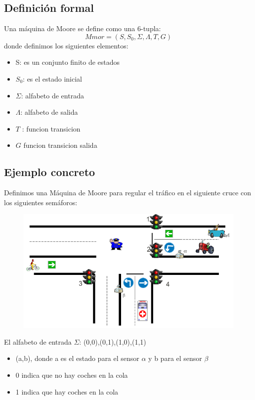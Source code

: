 \documentclass[12pt,a4paper]{article}
\begin{document}
	\subsection{Definición formal}
	Una máquina de Moore se define como una 6-tupla:
	\[ Mmor = (S,S_{0},\Sigma,\Lambda,T,G)  \]
	donde definimos los siguientes elementos:
	\begin{itemize}
		\item S: es un conjunto finito de estados
		\item $S_{0}$: es el estado inicial
		\item $\Sigma$: alfabeto de entrada
		\item $\Lambda$: alfabeto de salida
		\item $T$ : funcion transicion
		\item $G$ funcion transicion salida
	\end{itemize}
	\clearpage

	\subsection{Ejemplo concreto}
	Definimos una Máquina de Moore para regular el tráfico en el siguiente cruce con los siguientes semáforos:
		
	\begin{figure}[h]
		\centering
		\includegraphics[width=0.4\linewidth]{4}
		\caption{}
		\label{fig:4}
	\end{figure}

El alfabeto de entrada $\Sigma$: {(0,0),(0,1),(1,0),(1,1)}

	\begin{itemize}
		\item (a,b), donde a es el estado para el sensor $\alpha$ y b para el sensor $\beta$
		\item 0 indica que no hay coches en la cola
		\item 1 indica que hay coches en la cola
	\end{itemize}
\end{document}
